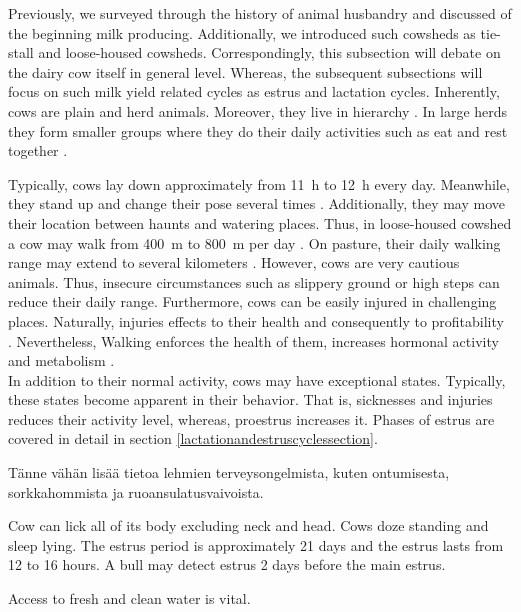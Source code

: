\documentclass[english,12pt,a4paper,pdftex,elec,utf8]{aaltothesis}
\begin{document}
Previously, we surveyed through the history of animal husbandry and discussed of the beginning milk producing. Additionally, we introduced such cowsheds as tie-stall and loose-housed cowsheds. Correspondingly, this subsection will debate on the dairy cow itself in general level. Whereas, the subsequent subsections will focus on such milk yield related cycles as estrus and lactation cycles. Inherently, cows are plain and herd animals. Moreover, they live in hierarchy \cite{julkaisuja52}. In large herds they form smaller groups where they do their daily activities such as eat and rest together \cite{julkaisuja52} \cite{lehmahavaintoja}. 

Typically, cows lay down approximately from \SI{11}{\hour} to \SI{12}{\hour} every day. Meanwhile, they stand up and change their pose several times \cite{luomunaudanruokinta}. Additionally, they may move their location between haunts and watering places. Thus, in loose-housed cowshed a cow may walk from  \SI{400}{\metre} to \SI{800}{\metre} per day \cite{luomuopas}. On pasture, their daily walking range may extend to several kilometers \cite{luomuopas} \cite{julkaisuja52}. However,  cows are very cautious animals. Thus, insecure circumstances such as slippery ground or high steps can reduce their daily range. Furthermore, cows can be easily injured in challenging places. Naturally, injuries effects to their health and consequently to profitability \cite{lehmahavaintoja}. Nevertheless, Walking enforces the health of them, increases hormonal activity and metabolism \cite{luomuopas}. \\

In addition to their normal activity, cows may have exceptional states. Typically, these states become apparent in their behavior. That is, sicknesses and injuries reduces their activity level, whereas, proestrus increases it. Phases of estrus are covered in detail in section \ref{lactationandestruscyclessection}.

Tänne vähän lisää tietoa lehmien terveysongelmista, kuten ontumisesta, sorkkahommista ja ruoansulatusvaivoista. 

 

 Cow can lick all of its body excluding neck and head. Cows doze standing and sleep lying. The estrus period is approximately 21 days and the estrus lasts from 12 to 16 hours. A bull may detect estrus 2 days before the main estrus.   \cite{julkaisuja52}

 Access to fresh and clean water is vital. \cite{luomuopas} 
\end{document}
